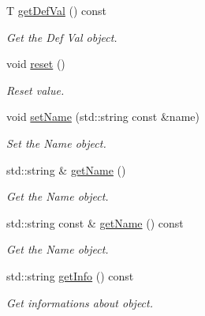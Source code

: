 \begin{DoxyCompactItemize}
T \hyperlink{class_json_obj_a3aa6312aed0218066f20870829c2b044}{get\+Def\+Val} () const
\begin{DoxyCompactList}\small\item\em Get the Def Val object. \end{DoxyCompactList}\item 
\mbox{\label{class_json_obj_a39c1a9d98910496e1b4071e1f1f83096}} 
void \hyperlink{class_json_obj_a39c1a9d98910496e1b4071e1f1f83096}{reset} ()
\begin{DoxyCompactList}\small\item\em Reset value. \end{DoxyCompactList}\item 
void \hyperlink{class_json_obj_a1b9338afd56f88cc311d45fa8a834026}{set\+Name} (std\+::string const \&name)
\begin{DoxyCompactList}\small\item\em Set the Name object. \end{DoxyCompactList}\item 
std\+::string \& \hyperlink{class_json_obj_a8111ceed590213968e777380f60e443a}{get\+Name} ()
\begin{DoxyCompactList}\small\item\em Get the Name object. \end{DoxyCompactList}\item 
std\+::string const  \& \hyperlink{class_json_obj_afb9de633557bc0289d65e8aac2e98936}{get\+Name} () const
\begin{DoxyCompactList}\small\item\em Get the Name object. \end{DoxyCompactList}\item 
std\+::string \hyperlink{class_json_obj_a095b952121c05f145ada6542bd46d532}{get\+Info} () const
\begin{DoxyCompactList}\small\item\em Get informations about object. \end{DoxyCompactList}\end{DoxyCompactItemize}
